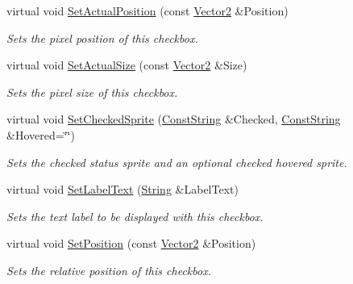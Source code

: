 \begin{DoxyCompactItemize}
virtual void \hyperlink{classMezzanine_1_1UI_1_1CheckBox_afa566e7ad9bd33354a76e4ea964e85bf}{SetActualPosition} (const \hyperlink{classMezzanine_1_1Vector2}{Vector2} \&Position)
\begin{DoxyCompactList}\small\item\em Sets the pixel position of this checkbox. \item\end{DoxyCompactList}\item 
virtual void \hyperlink{classMezzanine_1_1UI_1_1CheckBox_a063a9c0ab24ddc4332711a7045e2786d}{SetActualSize} (const \hyperlink{classMezzanine_1_1Vector2}{Vector2} \&Size)
\begin{DoxyCompactList}\small\item\em Sets the pixel size of this checkbox. \item\end{DoxyCompactList}\item 
virtual void \hyperlink{classMezzanine_1_1UI_1_1CheckBox_a8f53b9129268f6d75d3f6539b11222df}{SetCheckedSprite} (\hyperlink{namespaceMezzanine_a63cd699ac54b73953f35ec9cfc05e506}{ConstString} \&Checked, \hyperlink{namespaceMezzanine_a63cd699ac54b73953f35ec9cfc05e506}{ConstString} \&Hovered=\char`\"{}\char`\"{})
\begin{DoxyCompactList}\small\item\em Sets the checked status sprite and an optional checked hovered sprite. \item\end{DoxyCompactList}\item 
virtual void \hyperlink{classMezzanine_1_1UI_1_1CheckBox_a720b1c4a1f4289b81204ed48016caf9e}{SetLabelText} (\hyperlink{namespaceMezzanine_acf9fcc130e6ebf08e3d8491aebcf1c86}{String} \&LabelText)
\begin{DoxyCompactList}\small\item\em Sets the text label to be displayed with this checkbox. \item\end{DoxyCompactList}\item 
virtual void \hyperlink{classMezzanine_1_1UI_1_1CheckBox_ab12deffc753623b224191ee294626a65}{SetPosition} (const \hyperlink{classMezzanine_1_1Vector2}{Vector2} \&Position)
\begin{DoxyCompactList}\small\item\em Sets the relative position of this checkbox. \item\end{DoxyCompactList}\item 

\end{DoxyCompactItemize}
